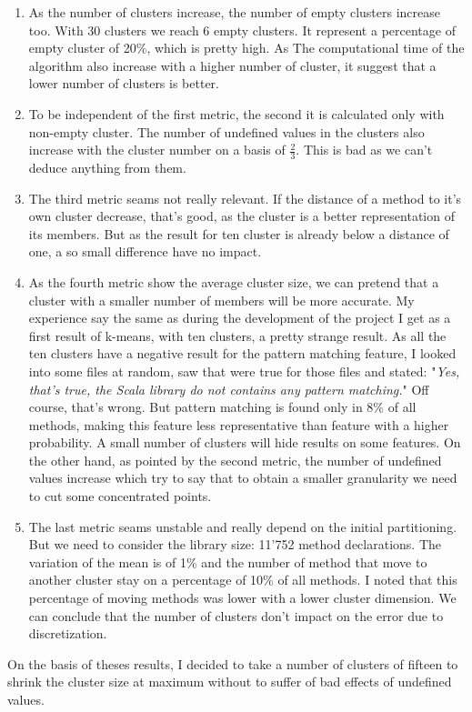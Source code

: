 \documentclass[12pt]{article}
\begin{document}
\begin{enumerate}
\item As the number of clusters increase, the number of empty clusters increase too. With 30 clusters we reach 6 empty clusters. It represent a percentage of empty cluster of 20\%, which is pretty high. As The computational time of the algorithm also increase with a higher number of cluster, it suggest that a lower number of clusters is better.
\item To be independent of the first metric, the second it is calculated only with non-empty cluster. The number of undefined values in the clusters also increase with the cluster number on a basis of $\frac{2}{3}$. This is bad as we can't deduce anything from them.
\item The third metric seams not really relevant. If the distance of a method to it's own cluster decrease, that's good, as the cluster is a better representation of its members. But as the result for ten cluster is already below a distance of one, a so small difference have no impact.
\item As the fourth metric show the average cluster size, we can pretend that a cluster with a smaller number of members will be more accurate. My experience say the same as during the development of the project I get as a first result of k-means, with ten clusters, a pretty strange result. As all the ten clusters have a negative result for the pattern matching feature, I looked into some files at random, saw that were true for those files and stated: "\textit{Yes, that's true, the Scala library do not contains any pattern matching.}" Off course, that's wrong. But pattern matching is found only in 8\% of all methods, making this feature less representative than feature with a higher probability. A small number of clusters will hide results on some features. On the other hand, as pointed by the second metric, the number of undefined values increase which try to say that to obtain a smaller granularity we need to cut some concentrated points.
\item The last metric seams unstable and really depend on the initial partitioning. But we need to consider the library size: 11'752 method declarations. The variation of the mean is of 1\% and the number of method that move to another cluster stay on a percentage of 10\% of all methods. I noted that this percentage of moving methods was lower with a lower cluster dimension. We can conclude that the number of clusters don't impact on the error due to discretization.
\end{enumerate}
On the basis of theses results, I decided to take a number of clusters of fifteen to shrink the cluster size at maximum without to suffer of bad effects of undefined values.
\end{document}
